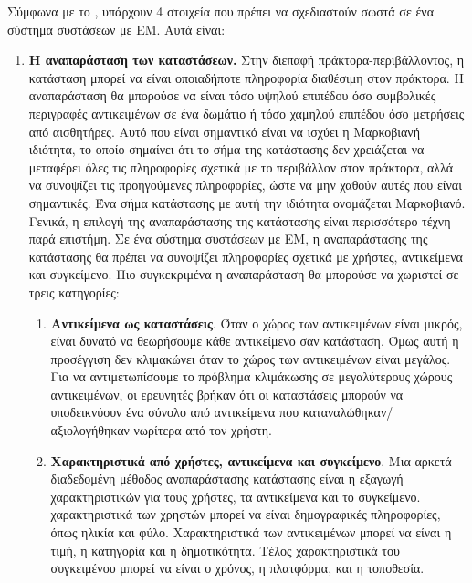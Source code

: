 Σύμφωνα με το \cite{rl_recommenders_2021}, υπάρχουν 4 στοιχεία που πρέπει να σχεδιαστούν σωστά σε ένα σύστημα συστάσεων με ΕΜ. Αυτά είναι:
\begin{enumerate}
    \item \textbf{Η αναπαράσταση των καταστάσεων.} Στην διεπαφή πράκτορα-περιβάλλοντος, η κατάσταση μπορεί να είναι οποιαδήποτε πληροφορία διαθέσιμη στον πράκτορα. Η αναπαράσταση θα μπορούσε να είναι τόσο υψηλού επιπέδου όσο συμβολικές περιγραφές αντικειμένων σε ένα δωμάτιο ή τόσο χαμηλού επιπέδου όσο μετρήσεις από αισθητήρες. Αυτό που είναι σημαντικό είναι να ισχύει η Μαρκοβιανή ιδιότητα, το οποίο σημαίνει ότι το σήμα της κατάστασης δεν χρειάζεται να μεταφέρει όλες τις πληροφορίες σχετικά με το περιβάλλον στον πράκτορα, αλλά να συνοψίζει τις προηγούμενες πληροφορίες, ώστε να μην χαθούν αυτές που είναι σημαντικές. Ένα σήμα κατάστασης με αυτή την ιδιότητα ονομάζεται Μαρκοβιανό. Γενικά, η επιλογή της αναπαράστασης της κατάστασης είναι περισσότερο τέχνη παρά επιστήμη. Σε ένα σύστημα συστάσεων με ΕΜ, η αναπαράστασης της κατάστασης θα πρέπει να συνοψίζει πληροφορίες σχετικά με χρήστες, αντικείμενα και συγκείμενο. Πιο συγκεκριμένα η αναπαράσταση θα μπορούσε να χωριστεί σε τρεις κατηγορίες:
          \begin{enumerate}
              \item \textbf{Αντικείμενα ως καταστάσεις}. Όταν ο χώρος των αντικειμένων είναι μικρός, είναι δυνατό να θεωρήσουμε κάθε αντικείμενο σαν κατάσταση. Όμως αυτή η προσέγγιση δεν κλιμακώνει όταν το χώρος των αντικειμένων είναι μεγάλος. Για να αντιμετωπίσουμε το πρόβλημα κλιμάκωσης σε μεγαλύτερους χώρους αντικειμένων, οι ερευνητές βρήκαν ότι οι καταστάσεις μπορούν να υποδεικνύουν ένα σύνολο από αντικείμενα που καταναλώθηκαν/αξιολογήθηκαν νωρίτερα από τον χρήστη.
              \item \textbf{Χαρακτηριστικά από χρήστες, αντικείμενα και συγκείμενο}. Μια αρκετά διαδεδομένη μέθοδος αναπαράστασης κατάστασης είναι η εξαγωγή χαρακτηριστικών για τους χρήστες, τα αντικείμενα και το συγκείμενο. χαρακτηριστικά των χρηστών μπορεί να είναι δημογραφικές πληροφορίες, όπως ηλικία και φύλο. Χαρακτηριστικά των αντικειμένων μπορεί να είναι η τιμή, η κατηγορία και η δημοτικότητα. Τέλος χαρακτηριστικά του συγκειμένου μπορεί να είναι ο χρόνος, η πλατφόρμα, και η τοποθεσία.

\end{enumerate}
\end{enumerate}

